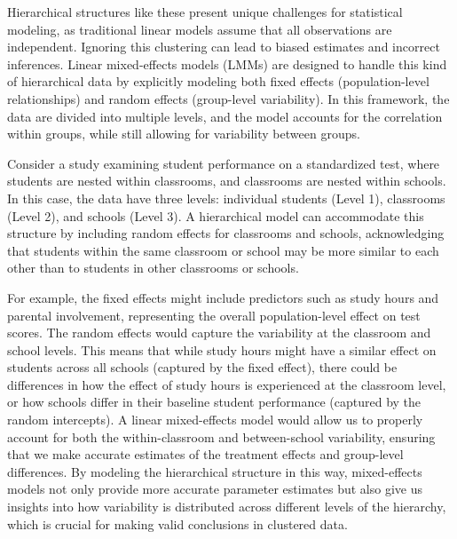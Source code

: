Hierarchical structures like these present unique challenges for statistical modeling, as traditional linear models assume that all observations are independent. Ignoring this clustering can lead to biased estimates and incorrect inferences. Linear mixed-effects models (LMMs) are designed to handle this kind of hierarchical data by explicitly modeling both fixed effects (population-level relationships) and random effects (group-level variability). In this framework, the data are divided into multiple levels, and the model accounts for the correlation within groups, while still allowing for variability between groups.

Consider a study examining student performance on a standardized test, where students are nested within classrooms, and classrooms are nested within schools. In this case, the data have three levels: individual students (Level 1), classrooms (Level 2), and schools (Level 3). A hierarchical model can accommodate this structure by including random effects for classrooms and schools, acknowledging that students within the same classroom or school may be more similar to each other than to students in other classrooms or schools.

For example, the fixed effects might include predictors such as study hours and parental involvement, representing the overall population-level effect on test scores. The random effects would capture the variability at the classroom and school levels. This means that while study hours might have a similar effect on students across all schools (captured by the fixed effect), there could be differences in how the effect of study hours is experienced at the classroom level, or how schools differ in their baseline student performance (captured by the random intercepts). A linear mixed-effects model would allow us to properly account for both the within-classroom and between-school variability, ensuring that we make accurate estimates of the treatment effects and group-level differences. By modeling the hierarchical structure in this way, mixed-effects models not only provide more accurate parameter estimates but also give us insights into how variability is distributed across different levels of the hierarchy, which is crucial for making valid conclusions in clustered data.

